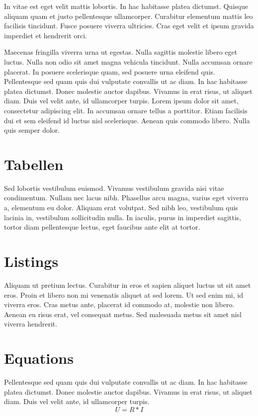 In vitae est eget velit mattis lobortis. In hac habitasse platea dictumst. Quisque aliquam quam et justo pellentesque ullamcorper. Curabitur elementum mattis leo facilisis tincidunt. Fusce posuere viverra ultricies. Cras eget velit et ipsum gravida imperdiet et hendrerit orci.

Maecenas fringilla viverra urna ut egestas. Nulla sagittis molestie libero eget luctus. Nulla non odio sit amet magna vehicula tincidunt. Nulla accumsan ornare placerat. In posuere scelerisque quam, sed posuere urna eleifend quis. Pellentesque sed quam quis dui vulputate convallis ut ac diam. In hac habitasse platea dictumst. Donec molestie auctor dapibus. Vivamus in erat risus, ut aliquet diam. Duis vel velit ante, id ullamcorper turpis. Lorem ipsum dolor sit amet, consectetur adipiscing elit. In accumsan ornare tellus a porttitor. Etiam facilisis dui et sem eleifend id luctus nisl scelerisque. Aenean quis commodo libero. Nulla quis semper dolor. 

%
%
\section{Tabellen}
\label{sec:chapter03:tabellen}
Sed lobortis vestibulum euismod. Vivamus vestibulum gravida nisi vitae condimentum. Nullam nec lacus nibh. Phasellus arcu magna, varius eget viverra a, elementum eu dolor. Aliquam erat volutpat. Sed nibh leo, vestibulum quis lacinia in, vestibulum sollicitudin nulla. In iaculis, purus in imperdiet sagittis, tortor diam pellentesque lectus, eget faucibus ante elit at tortor.

%
%
\section{Listings}
\label{sec:chapter03:listings}
Aliquam ut pretium lectus. Curabitur in eros et sapien aliquet luctus ut sit amet eros. Proin et libero non mi venenatis aliquet at sed lorem. Ut sed enim mi, id viverra eros. Cras metus ante, placerat id commodo at, molestie non libero. Aenean eu risus erat, vel consequat metus. Sed malesuada metus sit amet nisl viverra hendrerit.


%
%
\section{Equations}
\label{sec:chapter03:equations}
Pellentesque sed quam quis dui vulputate convallis ut ac diam. In hac habitasse platea dictumst. Donec molestie auctor dapibus. Vivamus in erat risus, ut aliquet diam. Duis vel velit ante, id ullamcorper turpis.
%
\begin{equation}
 U = R * I
\end{equation}

